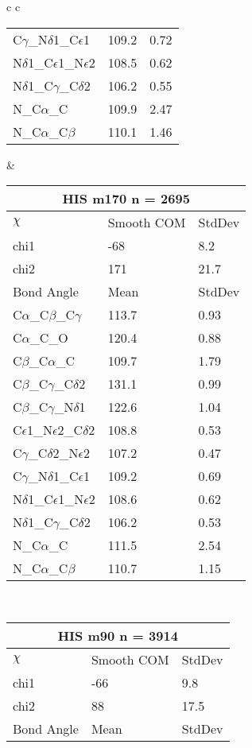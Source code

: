 \begin{longtable}{ c c }
\begin{tabular}{ l l l }
  C$\gamma$\_N$\delta$1\_C$\epsilon$1 & 109.2 & 0.72\\
  N$\delta$1\_C$\epsilon$1\_N$\epsilon$2 & 108.5 & 0.62\\
  N$\delta$1\_C$\gamma$\_C$\delta$2 & 106.2 & 0.55\\
  N\_C$\alpha$\_C & 109.9 & 2.47\\
  N\_C$\alpha$\_C$\beta$ & 110.1 & 1.46\\
  \bottomrule
  \end{tabular}
  &
  \begin{tabular}{ l l l }
  \toprule
  \multicolumn{3}{c}{HIS \textbf{m170} n = 2695} \\ \toprule
  $\chi$       & Smooth COM & StdDev \\ \midrule
  chi1 & -68 & 8.2 \\ 
  chi2 & 171 & 21.7 \\ \midrule
  Bond Angle   & Mean     & StdDev \\ \midrule
  C$\alpha$\_C$\beta$\_C$\gamma$ & 113.7 & 0.93\\
  C$\alpha$\_C\_O & 120.4 & 0.88\\
  C$\beta$\_C$\alpha$\_C & 109.7 & 1.79\\
  C$\beta$\_C$\gamma$\_C$\delta$2 & 131.1 & 0.99\\
  C$\beta$\_C$\gamma$\_N$\delta$1 & 122.6 & 1.04\\
  C$\epsilon$1\_N$\epsilon$2\_C$\delta$2 & 108.8 & 0.53\\
  C$\gamma$\_C$\delta$2\_N$\epsilon$2 & 107.2 & 0.47\\
  C$\gamma$\_N$\delta$1\_C$\epsilon$1 & 109.2 & 0.69\\
  N$\delta$1\_C$\epsilon$1\_N$\epsilon$2 & 108.6 & 0.62\\
  N$\delta$1\_C$\gamma$\_C$\delta$2 & 106.2 & 0.53\\
  N\_C$\alpha$\_C & 111.5 & 2.54\\
  N\_C$\alpha$\_C$\beta$ & 110.7 & 1.15\\
  \bottomrule
  \end{tabular}
  \\
  \begin{tabular}{ l l l }
  \toprule
  \multicolumn{3}{c}{HIS \textbf{m90} n = 3914} \\ \toprule
  $\chi$       & Smooth COM & StdDev \\ \midrule
  chi1 & -66 & 9.8 \\ 
  chi2 & 88 & 17.5 \\ \midrule
  Bond Angle   & Mean     & StdDev \\ \midrule

\end{tabular}
\end{longtable}
